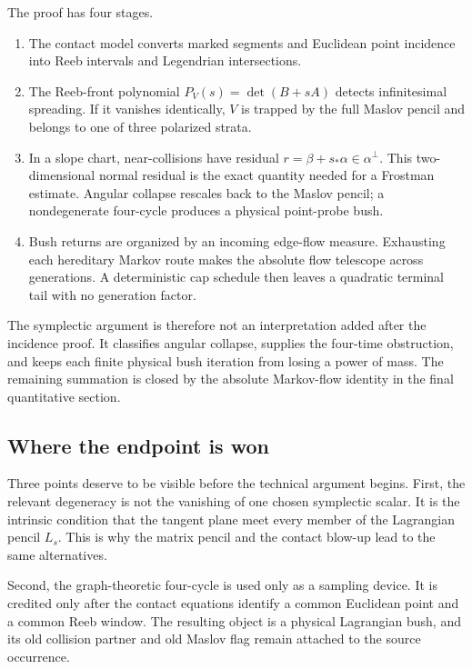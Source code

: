 \documentclass[10pt]{article}
\begin{document}
The proof has four stages.
\begin{enumerate}[label=\textnormal{(\roman*)}]
\item The contact model converts marked segments and Euclidean point incidence into Reeb
intervals and Legendrian intersections.
\item The Reeb-front polynomial $P_V(s)=\det(B+sA)$ detects infinitesimal spreading. If it
vanishes identically, $V$ is trapped by the full Maslov pencil and belongs to one of three
polarized strata.
\item In a slope chart, near-collisions have residual
$r=\beta+s_*\alpha\in\alpha^\perp$. This two-dimensional normal residual is the exact
quantity needed for a Frostman estimate. Angular collapse rescales back to the Maslov pencil;
a nondegenerate four-cycle produces a physical point-probe bush.
\item Bush returns are organized by an incoming edge-flow measure.  Exhausting each hereditary
Markov route makes the absolute flow telescope across generations.  A deterministic cap schedule
then leaves a quadratic terminal tail with no generation factor.
\end{enumerate}

The symplectic argument is therefore not an interpretation added after the incidence proof. It
classifies angular collapse, supplies the four-time obstruction, and keeps each finite physical
bush iteration from losing a power of mass.  The remaining summation is closed by the absolute Markov-flow identity in the final
quantitative section.

\subsection{Where the endpoint is won}

Three points deserve to be visible before the technical argument begins.  First, the relevant
degeneracy is not the vanishing of one chosen symplectic scalar.  It is the intrinsic condition
that the tangent plane meet every member of the Lagrangian pencil \(L_s\).  This is why the
matrix pencil and the contact blow-up lead to the same alternatives.

Second, the graph-theoretic four-cycle is used only as a sampling device.  It is credited only
after the contact equations identify a common Euclidean point and a common Reeb window.  The
resulting object is a physical Lagrangian bush, and its old collision partner and old Maslov flag
remain attached to the source occurrence.
\end{document}
